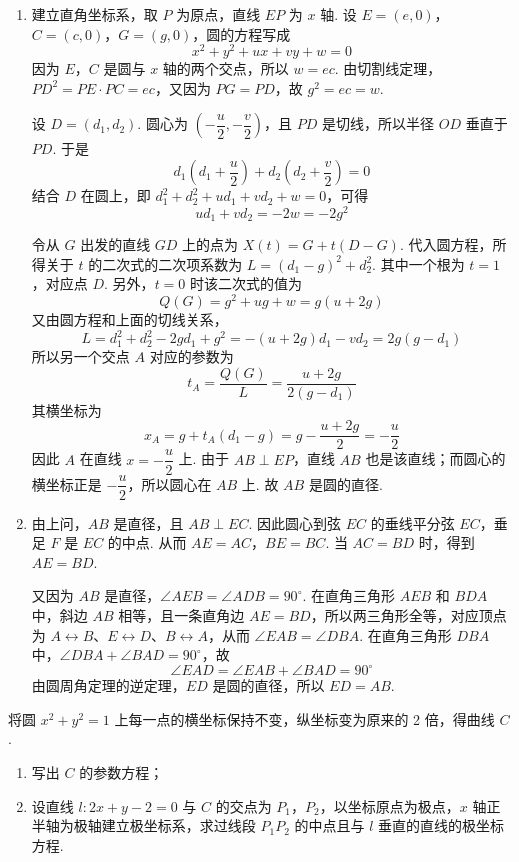 \begin{solution}
\begin{enumerate}
\item 建立直角坐标系，取 \(P\) 为原点，直线 \(EP\) 为 \(x\) 轴. 设 \(E=(e,0)\)，\(C=(c,0)\)，\(G=(g,0)\)，圆的方程写成
\[
x^{2}+y^{2}+ux+vy+w=0
\]
因为 \(E\)，\(C\) 是圆与 \(x\) 轴的两个交点，所以 \(w=ec\). 由切割线定理，\(PD^{2}=PE\cdot PC=ec\)，又因为 \(PG=PD\)，故 \(g^{2}=ec=w\).

设 \(D=(d_{1},d_{2})\). 圆心为 \(\left(-\dfrac{u}{2},-\dfrac{v}{2}\right)\)，且 \(PD\) 是切线，所以半径 \(OD\) 垂直于 \(PD\). 于是
\[
d_{1}\left(d_{1}+\frac{u}{2}\right)+d_{2}\left(d_{2}+\frac{v}{2}\right)=0
\]
结合 \(D\) 在圆上，即 \(d_{1}^{2}+d_{2}^{2}+ud_{1}+vd_{2}+w=0\)，可得
\[
ud_{1}+vd_{2}=-2w=-2g^{2}
\]

令从 \(G\) 出发的直线 \(GD\) 上的点为 \(X(t)=G+t(D-G)\). 代入圆方程，所得关于 \(t\) 的二次式的二次项系数为 \(L=(d_{1}-g)^{2}+d_{2}^{2}\). 其中一个根为 \(t=1\)，对应点 \(D\). 另外，\(t=0\) 时该二次式的值为
\[
Q(G)=g^{2}+ug+w=g(u+2g)
\]
又由圆方程和上面的切线关系，
\[
L=d_{1}^{2}+d_{2}^{2}-2gd_{1}+g^{2}=-(u+2g)d_{1}-vd_{2}=2g(g-d_{1})
\]
所以另一个交点 \(A\) 对应的参数为
\[
t_{A}=\frac{Q(G)}{L}=\frac{u+2g}{2(g-d_{1})}
\]
其横坐标为
\[
x_{A}=g+t_{A}(d_{1}-g)=g-\frac{u+2g}{2}=-\frac{u}{2}
\]
因此 \(A\) 在直线 \(x=-\dfrac{u}{2}\) 上. 由于 \(AB\perp EP\)，直线 \(AB\) 也是该直线；而圆心的横坐标正是 \(-\dfrac{u}{2}\)，所以圆心在 \(AB\) 上. 故 \(AB\) 是圆的直径.
\item 由上问，\(AB\) 是直径，且 \(AB\perp EC\). 因此圆心到弦 \(EC\) 的垂线平分弦 \(EC\)，垂足 \(F\) 是 \(EC\) 的中点. 从而 \(AE=AC\)，\(BE=BC\). 当 \(AC=BD\) 时，得到 \(AE=BD\).

又因为 \(AB\) 是直径，\(\angle AEB=\angle ADB=90^{\circ}\). 在直角三角形 \(AEB\) 和 \(BDA\) 中，斜边 \(AB\) 相等，且一条直角边 \(AE=BD\)，所以两三角形全等，对应顶点为 \(A\leftrightarrow B\)、\(E\leftrightarrow D\)、\(B\leftrightarrow A\)，从而 \(\angle EAB=\angle DBA\). 在直角三角形 \(DBA\) 中，\(\angle DBA+\angle BAD=90^{\circ}\)，故
\[
\angle EAD=\angle EAB+\angle BAD=90^{\circ}
\]
由圆周角定理的逆定理，\(ED\) 是圆的直径，所以 \(ED=AB\).
\end{enumerate}
\end{solution}

\begin{problem}
将圆 \(x^{2} + y^{2} = 1\) 上每一点的横坐标保持不变，纵坐标变为原来的 2 倍，得曲线 \(C\).
\begin{enumerate}
\item 写出 \(C\) 的参数方程；
\item 设直线 \(l: 2x + y - 2 = 0\) 与 \(C\) 的交点为 \(P_1\)，\(P_2\)，以坐标原点为极点，\(x\) 轴正半轴为极轴建立极坐标系，求过线段 \(P_1P_2\) 的中点且与 \(l\) 垂直的直线的极坐标方程.
\end{enumerate}
\end{problem}


